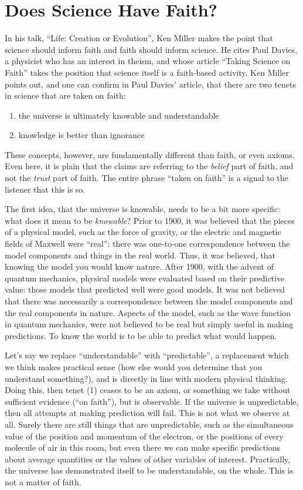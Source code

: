 \section{Does Science Have Faith?}

In his talk, ``Life: Creation or Evolution''\cite{Miller:2009aa}, Ken Miller makes the point that science should inform
faith and faith should inform science. He cites Paul Davies, a physicist
who has an interest in theism, and whose article
``Taking
Science on Faith''\cite{davies2007taking} takes the position that science itself is a
faith-based activity. Ken Miller points out, and one can confirm in Paul
Davies' article, that there are two tenets in science that are taken on
faith:

\begin{enumerate}
\item
  the universe is ultimately knowable and understandable
\item
  knowledge is better than ignorance
\end{enumerate}

These concepts, however, are fundamentally different than faith, or even axioms.  Even here, it is plain that the claims are referring to the {\em belief} part of faith, and not the {\em trust} part of faith.  The entire phrase ``taken on faith'' is a signal to the listener that this is so.


The first idea, that the universe is knowable, needs to be a bit more specific: what does it mean to be {\em knowable}? Prior to 1900, it was
believed that the pieces of a physical model, such as the force of
gravity, or the electric and magnetic fields of Maxwell were ``real'':
there was one-to-one correspondence between the model components and
things in the real world. Thus, it was believed, that knowing the model
you would know nature. After 1900, with the advent of quantum mechanics,
physical models were evaluated based on their predictive value: those
models that predicted well were good models. It was not believed that
there was necessarily a correspondence between the model components and
the real components in nature. Aspects of the model, such as the wave
function in quantum mechanics, were not believed to be real but simply useful in making
predictions. To know the world is to be able to predict what would
happen.

Let's say we replace ``understandable'' with ``predictable'', a
replacement which we think makes practical sense (how else would you
determine that you understand something?), and is directly in line with
modern physical thinking. Doing this, then tenet (1) ceases to be an
axiom, or something we take without sufficient evidence (``on faith''), but is observable. If the universe
is unpredictable, then all attempts at making prediction will fail. This
is not what we observe at all. Surely there are still things that are
unpredictable, such as the simultaneous value of the position and
momentum of the electron, or the positions of every molecule of air in
this room, but even there we can make specific predictions about average
quantities or the values of other variables of interest. Practically,
the universe has demonstrated itself to be understandable, on the whole.
This is not a matter of faith.

